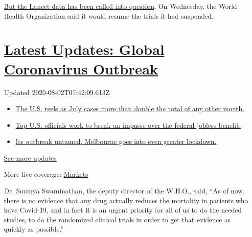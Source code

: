\href{https://cdf.nejm.org/services/GetOnlineFirstPDF.aspx?DOI=NEJMoa2016638}{But
the Lancet data has been called into question}. On Wednesday, the World
Health Organization said it would resume the trials it had suspended.

\hypertarget{latest-updates-global-coronavirus-outbreak}{%
\section{\texorpdfstring{\href{https://www.nytimes.com/2020/08/01/world/coronavirus-covid-19.html?action=click\&pgtype=Article\&state=default\&region=MAIN_CONTENT_1\&context=storylines_live_updates}{Latest
Updates: Global Coronavirus
Outbreak}}{Latest Updates: Global Coronavirus Outbreak}}\label{latest-updates-global-coronavirus-outbreak}}

Updated 2020-08-02T07:42:09.613Z

\begin{itemize}
\tightlist
\item
  \href{https://www.nytimes.com/2020/08/01/world/coronavirus-covid-19.html?action=click\&pgtype=Article\&state=default\&region=MAIN_CONTENT_1\&context=storylines_live_updates\#link-34047410}{The
  U.S. reels as July cases more than double the total of any other
  month.}
\item
  \href{https://www.nytimes.com/2020/08/01/world/coronavirus-covid-19.html?action=click\&pgtype=Article\&state=default\&region=MAIN_CONTENT_1\&context=storylines_live_updates\#link-780ec966}{Top
  U.S. officials work to break an impasse over the federal jobless
  benefit.}
\item
  \href{https://www.nytimes.com/2020/08/01/world/coronavirus-covid-19.html?action=click\&pgtype=Article\&state=default\&region=MAIN_CONTENT_1\&context=storylines_live_updates\#link-2bc8948}{Its
  outbreak untamed, Melbourne goes into even greater lockdown.}
\end{itemize}

\href{https://www.nytimes.com/2020/08/01/world/coronavirus-covid-19.html?action=click\&pgtype=Article\&state=default\&region=MAIN_CONTENT_1\&context=storylines_live_updates}{See
more updates}

More live coverage:
\href{https://www.nytimes.com/live/2020/07/31/business/stock-market-today-coronavirus?action=click\&pgtype=Article\&state=default\&region=MAIN_CONTENT_1\&context=storylines_live_updates}{Markets}

Dr. Soumya Swaminathan, the deputy director of the W.H.O., said, ``As of
now, there is no evidence that any drug actually reduces the mortality
in patients who have Covid-19, and in fact it is an urgent priority for
all of us to do the needed studies, to do the randomized clinical trials
in order to get that evidence as quickly as possible.''

